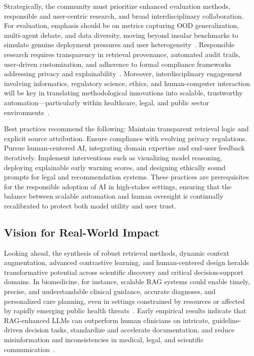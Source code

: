 \documentclass[sigconf]{acmart}
\begin{document}
Strategically, the community must prioritize enhanced evaluation methods, responsible and user-centric research, and broad interdisciplinary collaboration. For evaluation, emphasis should be on metrics capturing OOD generalization, multi-agent debate, and data diversity, moving beyond insular benchmarks to simulate genuine deployment pressures and user heterogeneity~\cite{ref4,ref5,ref39}. Responsible research requires transparency in retrieval provenance, automated audit trails, user-driven customization, and adherence to formal compliance frameworks addressing privacy and explainability~\cite{ref34,ref36,ref48,ref52}. Moreover, interdisciplinary engagement involving informatics, regulatory science, ethics, and human-computer interaction will be key in translating methodological innovations into scalable, trustworthy automation—particularly within healthcare, legal, and public sector environments~\cite{ref2,ref25,ref50,ref54}.

Best practices recommend the following:
Maintain transparent retrieval logic and explicit source attribution.
Ensure compliance with evolving privacy regulations.
Pursue human-centered AI, integrating domain expertise and end-user feedback iteratively.
Implement interventions such as visualizing model reasoning, deploying explainable early warning scores, and designing ethically sound prompts for legal and recommendation systems.
These practices are prerequisites for the responsible adoption of AI in high-stakes settings, ensuring that the balance between scalable automation and human oversight is continually recalibrated to protect both model utility and user trust.

\subsection{Vision for Real-World Impact}

Looking ahead, the synthesis of robust retrieval methods, dynamic context augmentation, advanced contrastive learning, and human-centered design heralds transformative potential across scientific discovery and critical decision-support domains. In biomedicine, for instance, scalable RAG systems could enable timely, precise, and understandable clinical guidance, accurate diagnoses, and personalized care planning, even in settings constrained by resources or affected by rapidly emerging public health threats~\cite{ref1, ref2, ref5, ref9, ref11}. Early empirical results indicate that RAG-enhanced LLMs can outperform human clinicians on intricate, guideline-driven decision tasks, standardize and accelerate documentation, and reduce misinformation and inconsistencies in medical, legal, and scientific communication~\cite{ref6, ref8, ref22, ref36, ref40}.
\end{document}
